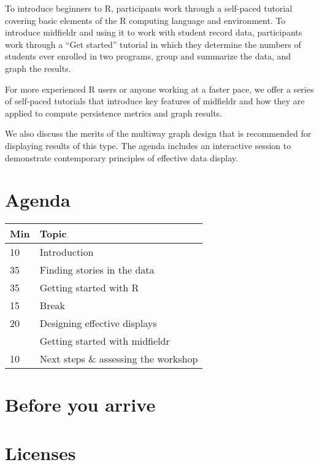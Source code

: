 \documentclass[
]{book}
\begin{document}
To introduce beginners to R, participants work through a self-paced tutorial covering basic elements of the R computing language and environment. To introduce midfieldr and using it to work with student record data, participants work through a ``Get started'' tutorial in which they determine the numbers of students ever enrolled in two programs, group and summarize the data, and graph the results.

For more experienced R users or anyone working at a faster pace, we offer a series of self-paced tutorials that introduce key features of midfieldr and how they are applied to compute persistence metrics and graph results.

We also discuss the merits of the multiway graph design that is recommended for displaying results of this type. The agenda includes an interactive session to demonstrate contemporary principles of effective data display.

\hypertarget{agenda}{%
\section*{Agenda}\label{agenda}}

\begin{tabular}{ll}
\toprule
Min & Topic\\
\midrule
10 & Introduction\\
35 & Finding stories in the data\\
35 & Getting started with R\\
15 & Break\\
20 & Designing effective displays\\
\addlinespace
55 & Getting started with midfieldr\\
10 & Next steps \& assessing the workshop\\
\bottomrule
\end{tabular}

\hypertarget{before-you-arrive}{%
\section*{Before you arrive}\label{before-you-arrive}}

\hypertarget{licenses}{%
\section*{Licenses}\label{licenses}}
\end{document}

